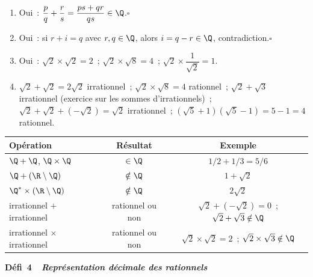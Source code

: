 \begin{enumerate}
  \item Oui~: $\dfrac pq+\dfrac rs=\dfrac{ps+qr}{qs}\in\Q$.\hfill$\square$
  \item Oui~: si $r+i=q$ avec $r,q\in\Q$, alors $i=q-r\in\Q$, contradiction.\hfill$\square$
  \item Oui~: $\sqrt2\times\sqrt2=2$~; $\sqrt2\times\sqrt8=4$~; $\sqrt2\times\dfrac1{\sqrt2}=1$.
  \item $\sqrt2+\sqrt2=2\sqrt2$ irrationnel~; $\sqrt2\times\sqrt8=4$ rationnel~;
        $\sqrt2+\sqrt3$ irrationnel (exercice sur les sommes d'irrationnels)~;
        $\sqrt2+\sqrt2+(-\sqrt2)=\sqrt2$ irrationnel~;
        $(\sqrt5+1)(\sqrt5-1)=5-1=4$ rationnel.
\end{enumerate}
\begin{center}
\renewcommand{\arraystretch}{1.3}
\begin{tabular}{|l|c|c|}
\hline
\rowcolor{BN!10}
Op\'eration & R\'esultat & Exemple \\
\hline
$\Q+\Q$, $\Q\times\Q$ & $\in\Q$ & $1/2+1/3=5/6$ \\
$\Q+(\R\setminus\Q)$ & $\notin\Q$ & $1+\sqrt2$ \\
$\Q^*\times(\R\setminus\Q)$ & $\notin\Q$ & $2\sqrt2$ \\
irrationnel $+$ irrationnel & rationnel ou non & $\sqrt2+(-\sqrt2)=0$~; $\sqrt2+\sqrt3\notin\Q$ \\
irrationnel $\times$ irrationnel & rationnel ou non & $\sqrt2\times\sqrt2=2$~; $\sqrt2\times\sqrt3\notin\Q$ \\
\hline
\end{tabular}
\end{center}
\noindent{}
{\color{BO}\bfseries\small D\'efi~4~\textendash\ \textit{Repr\'esentation d\'ecimale des rationnels}}
\par\smallskip

